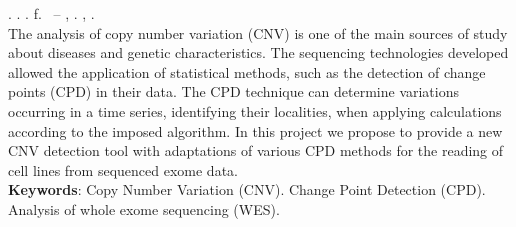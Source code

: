 
\begin{resumo}[ABSTRACT]
\begin{SingleSpacing}

\imprimirautorcitacao. \imprimirtitleabstract. \imprimirdata. \pageref {LastPage} f. \imprimirprojeto\ – \imprimirprograma, \imprimirinstituicao. \imprimirlocal, \imprimirdata.\\

The analysis of copy number variation (CNV) is one of the main sources of study about diseases and genetic characteristics. The sequencing technologies developed allowed the application of statistical methods, such as the detection of change points (CPD) in their data. The CPD technique can determine variations occurring in a time series, identifying their localities, when applying calculations according to the imposed algorithm. In this project we propose to provide a new CNV detection tool with adaptations of various CPD methods for the reading of cell lines from sequenced exome data. \\

\textbf{Keywords}: Copy Number Variation (CNV). Change Point Detection (CPD). Analysis of whole exome sequencing (WES).

\end{SingleSpacing}
\end{resumo}

